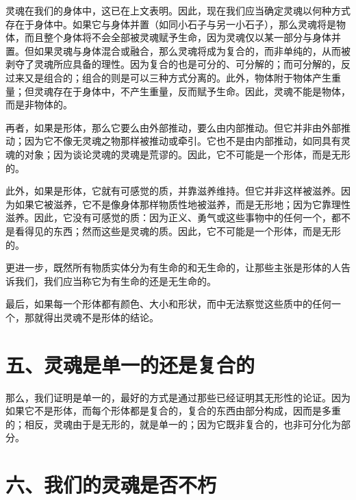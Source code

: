 灵魂在我们的身体中，这已在上文表明。因此，现在我们应当确定灵魂以何种方式存在于身体中。如果它与身体并置（如同小石子与另一小石子），那么灵魂将是物体，而且整个身体将不会全部被灵魂赋予生命，因为灵魂仅以某一部分与身体并置。但如果灵魂与身体混合或融合，那么灵魂将成为复合的，而非单纯的，从而被剥夺了灵魂所应具备的理性。因为复合的也是可分的、可分解的；而可分解的，反过来又是组合的；组合的则是可以三种方式分离的。此外，物体附于物体产生重量；但灵魂存在于身体中，不产生重量，反而赋予生命。因此，灵魂不能是物体，而是非物体的。\par

再者，如果是形体，那么它要么由外部推动，要么由内部推动。但它并非由外部推动；因为它不像无灵魂之物那样被推动或牵引。它也不是由内部推动，如同具有灵魂的对象；因为谈论灵魂的灵魂是荒谬的。因此，它不可能是一个形体，而是无形的。\par

此外，如果是形体，它就有可感觉的质，并靠滋养维持。但它并非这样被滋养。因为如果它被滋养，它不是像身体那样物质性地被滋养，而是无形地；因为它靠理性滋养。因此，它没有可感觉的质：因为正义、勇气或这些事物中的任何一个，都不是看得见的东西；然而这些是灵魂的质。因此，它不可能是一个形体，而是无形的。\par

更进一步，既然所有物质实体分为有生命的和无生命的，让那些主张是形体的人告诉我们，我们应当称它为有生命的还是无生命的。\par

最后，如果每一个形体都有颜色、大小和形状，而中无法察觉这些质中的任何一个，那就得出灵魂不是形体的结论。\par


\section{五、灵魂是单一的还是复合的}

那么，我们证明是单一的，最好的方式是通过那些已经证明其无形性的论证。因为如果它不是形体，而每个形体都是复合的，复合的东西由部分构成，因而是多重的；相反，灵魂由于是无形的，就是单一的；因为它既非复合的，也非可分化为部分。\par


\section{六、我们的灵魂是否不朽}

